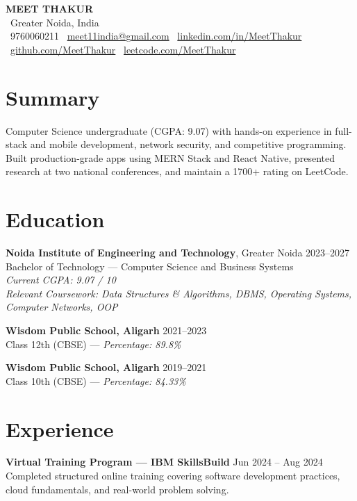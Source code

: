\documentclass[a4paper,10pt]{article}
\begin{document}
\begin{center}
    {\Huge \textbf{MEET THAKUR}}\\[2pt]
    {\small \faMapMarker\ Greater Noida, India}\\[3pt]
    \faPhone\ 9760060211 \quad
    \faEnvelope\ \href{mailto:meet11india@gmail.com}{meet11india@gmail.com} \quad
    \faLinkedin\ \href{https://linkedin.com/in/MeetThakur}{linkedin.com/in/MeetThakur} \\
    \faGithub\ \href{https://github.com/MeetThakur}{github.com/MeetThakur} \quad
    \faCode\ \href{https://leetcode.com/MeetThakur}{leetcode.com/MeetThakur}
\end{center}

\section*{Summary}
Computer Science undergraduate (CGPA: 9.07) with hands-on experience in full-stack and mobile development, network security, and competitive programming. Built production-grade apps using MERN Stack and React Native, presented research at two national conferences, and maintain a 1700+ rating on LeetCode.

\section*{Education}
\textbf{Noida Institute of Engineering and Technology}, Greater Noida \hfill 2023--2027 \\
Bachelor of Technology --- Computer Science and Business Systems \\
\textit{Current CGPA: 9.07 / 10} \\
\textit{Relevant Coursework: Data Structures \& Algorithms, DBMS, Operating Systems, Computer Networks, OOP}

\textbf{Wisdom Public School, Aligarh} \hfill 2021–2023 \\
Class 12th (CBSE) — \textit{Percentage: 89.8\%}

\textbf{Wisdom Public School, Aligarh} \hfill 2019–2021 \\
Class 10th (CBSE) — \textit{Percentage: 84.33\%}

\section*{Experience}
\textbf{Virtual Training Program — IBM SkillsBuild} \hfill Jun 2024 – Aug 2024 \\
Completed structured online training covering software development practices, cloud fundamentals, and real-world problem solving.
\end{document}
